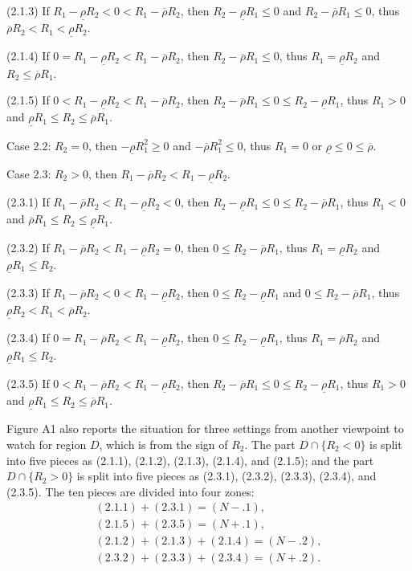 \documentclass[10pt]{article}
\begin{document}
(2.1.3) If $ R_1 - \underline{\rho} R_2 < 0 < R_1 - \overline{\rho} R_2 $, then $ R_2 - \underline{\rho} R_1 \leqslant 0 $ and $ R_2 - \overline{\rho} R_1 \leqslant 0 $, thus $ \overline{\rho} R_2 < R_1 < \underline{\rho} R_2 $.

(2.1.4) If $ 0 = R_1 - \underline{\rho} R_2 < R_1 - \overline{\rho} R_2 $, then $ R_2 - \overline{\rho} R_1 \leqslant 0 $, thus $ R_1 = \underline{\rho} R_2 $ and $ R_2 \leqslant \overline{\rho} R_1 $.

(2.1.5) If $ 0 < R_1 - \underline{\rho} R_2 < R_1 - \overline{\rho} R_2 $, then $ R_2 - \overline{\rho} R_1 \leqslant 0 \leqslant R_2 - \underline{\rho} R_1 $, thus $ R_1 > 0 $ and $ \underline{\rho} R_1 \leqslant R_2 \leqslant \overline{\rho} R_1 $. 

Case 2.2: $ R_2 = 0 $, then $ - \underline{\rho} R_1^2 \geqslant 0 $ and $ - \overline{\rho} R_1^2 \leqslant 0 $, thus $ R_1 = 0 $ or $ \underline{\rho} \leqslant 0 \leqslant \overline{\rho} $.

Case 2.3: $ R_2 > 0 $, then $ R_1 - \overline{\rho} R_2 < R_1 - \underline{\rho} R_2 $.

(2.3.1) If $ R_1 - \overline{\rho} R_2 < R_1 - \underline{\rho} R_2 < 0 $, then $ R_2 - \underline{\rho} R_1 \leqslant 0 \leqslant R_2 - \overline{\rho} R_1 $, thus $ R_1 < 0 $ and $ \overline{\rho} R_1 \leqslant R_2 \leqslant \underline{\rho} R_1 $. 

(2.3.2) If $ R_1 - \overline{\rho} R_2 < R_1 - \underline{\rho} R_2 = 0 $, then $ 0 \leqslant R_2 - \overline{\rho} R_1 $, thus $ R_1 = \underline{\rho} R_2 $ and $ \underline{\rho} R_1 \leqslant R_2 $.

(2.3.3) If $ R_1 - \overline{\rho} R_2 < 0 < R_1 - \underline{\rho} R_2 $, then $ 0 \leqslant R_2 - \underline{\rho} R_1 $ and $ 0 \leqslant R_2 - \overline{\rho} R_1 $, thus $ \underline{\rho} R_2 < R_1 < \overline{\rho} R_2 $.

(2.3.4) If $ 0 = R_1 - \overline{\rho} R_2 < R_1 - \underline{\rho} R_2 $, then $ 0 \leqslant R_2 - \underline{\rho} R_1 $, thus $ R_1 = \overline{\rho} R_2 $ and $ \underline{\rho} R_1 \leqslant R_2 $.

(2.3.5) If $ 0 < R_1 - \overline{\rho} R_2 < R_1 - \underline{\rho} R_2 $, then $ R_2 - \overline{\rho} R_1 \leqslant 0 \leqslant R_2 - \underline{\rho} R_1 $, thus $ R_1 > 0 $ and $ \underline{\rho} R_1 \leqslant R_2 \leqslant \overline{\rho} R_1 $. 

Figure A1 also reports the situation for three settings from another viewpoint to watch for region $D$, which is from the sign of $ R_2 $. The part $ D \cap \{ R_2 < 0 \} $ is split into five pieces as (2.1.1), (2.1.2), (2.1.3), (2.1.4), and (2.1.5); and the part $ D \cap \{ R_2 > 0 \} $ is split into five pieces as (2.3.1), (2.3.2), (2.3.3), (2.3.4), and (2.3.5). The ten pieces are divided into four zones:
\begin{eqnarray*}
& (2.1.1) + (2.3.1) = (N-.1), & \\
& (2.1.5) + (2.3.5) = (N+.1), & \\
& (2.1.2) + (2.1.3) + (2.1.4) = (N-.2), & \\
& (2.3.2) + (2.3.3) + (2.3.4) = (N+.2). &
\end{eqnarray*}
\end{document}
